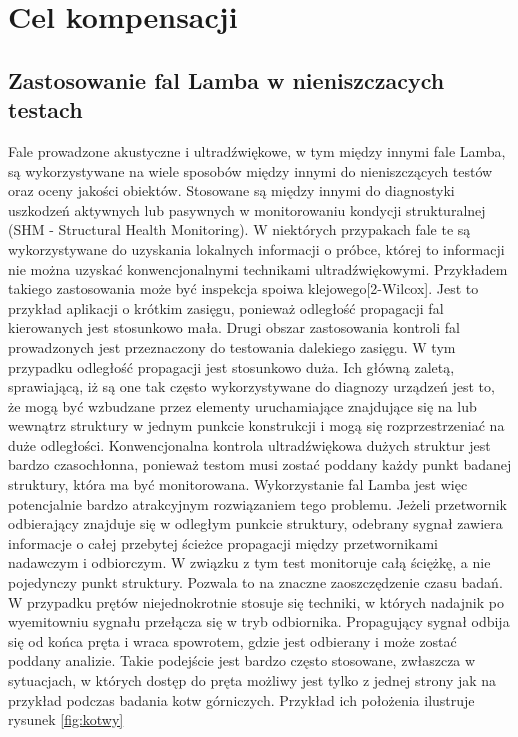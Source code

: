 
\section{Cel kompensacji}
\label{sec:cel_komp}

\subsection{Zastosowanie fal Lamba w nieniszczacych testach}

Fale prowadzone akustyczne i ultradźwiękowe, w tym między innymi fale Lamba, są wykorzystywane na wiele sposobów między innymi do nieniszczących testów oraz oceny jakości obiektów. Stosowane są między innymi do diagnostyki uszkodzeń aktywnych lub pasywnych w monitorowaniu kondycji strukturalnej (SHM - Structural Health Monitoring). W niektórych przypakach fale te są wykorzystywane do uzyskania lokalnych informacji o próbce, której to informacji nie można uzyskać konwencjonalnymi technikami ultradźwiękowymi. Przykładem takiego zastosowania może być inspekcja spoiwa klejowego[2-Wilcox]. Jest to przykład aplikacji o krótkim zasięgu, ponieważ odległość propagacji fal kierowanych jest stosunkowo mała. Drugi obszar zastosowania kontroli fal prowadzonych jest przeznaczony do testowania dalekiego zasięgu. W tym przypadku odległość propagacji jest stosunkowo duża. Ich główną zaletą, sprawiającą, iż są one tak często wykorzystywane do diagnozy urządzeń jest to, że mogą być wzbudzane przez elementy uruchamiające znajdujące się na lub wewnątrz struktury w jednym punkcie konstrukcji i mogą się rozprzestrzeniać na duże odległości. Konwencjonalna kontrola ultradźwiękowa dużych struktur jest bardzo czasochłonna, ponieważ testom musi zostać poddany każdy punkt badanej struktury, która ma być monitorowana. Wykorzystanie fal Lamba jest więc potencjalnie bardzo atrakcyjnym rozwiązaniem tego problemu. Jeżeli przetwornik odbierający znajduje się w odległym punkcie struktury, odebrany sygnał zawiera informacje o całej przebytej ścieżce propagacji między przetwornikami nadawczym i odbiorczym. W związku z tym test monitoruje całą ściężkę, a nie pojedynczy punkt struktury. Pozwala to na znaczne zaoszczędzenie czasu badań. W przypadku prętów niejednokrotnie stosuje się techniki, w których nadajnik po wyemitowniu sygnału przełącza się w tryb odbiornika. Propagujący sygnał odbija się od końca pręta i wraca spowrotem, gdzie jest odbierany i może zostać poddany analizie. Takie podejście jest bardzo często stosowane, zwłaszcza w sytuacjach, w których dostęp do pręta możliwy jest tylko z jednej strony jak na przykład podczas badania kotw górniczych. Przykład ich położenia ilustruje rysunek \ref{fig:kotwy}
